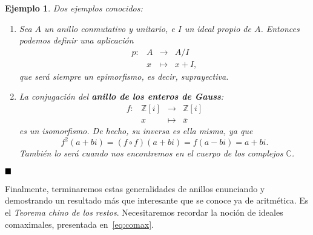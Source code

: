 \documentclass[12pt]{article}
\newtheorem{example}{Ejemplo}[theorem]
\begin{document}
\begin{example} Dos ejemplos conocidos: \begin{enumerate}
\item Sea $A$ un anillo conmutativo y unitario, e $I$ un ideal propio de $A$. Entonces podemos definir una aplicación $$\begin{array}{rccl}
p \colon &A&\longrightarrow &A/I \\
&x& \longmapsto &x + I,
\end{array}
$$ que será siempre un epimorfismo, es decir, suprayectiva.
\item La conjugación del \textbf{anillo de los enteros de Gauss}: $$\begin{array}{rccl}
f \colon &\mathbb{Z}[i]&\longrightarrow &\mathbb{Z}[i] \\
&x& \longmapsto &\bar{x}
\end{array}
$$ es un isomorfismo. De hecho, su inversa es ella misma, ya que $$f^{2}(a+bi)= (f \circ f)(a+bi)= f(a-bi)= a+bi.$$
También lo será cuando nos encontremos en el cuerpo de los complejos $\mathbb{C}$.
\end{enumerate}
\end{example}
$\hfill \blacksquare$

Finalmente, terminaremos estas generalidades de anillos enunciando y demostrando un resultado más que interesante que se conoce ya de aritmética. Es el \textit{Teorema chino de los restos}. Necesitaremos recordar la noción de ideales comaximales, presentada en~\ref{eq:comax}.
\end{document}
